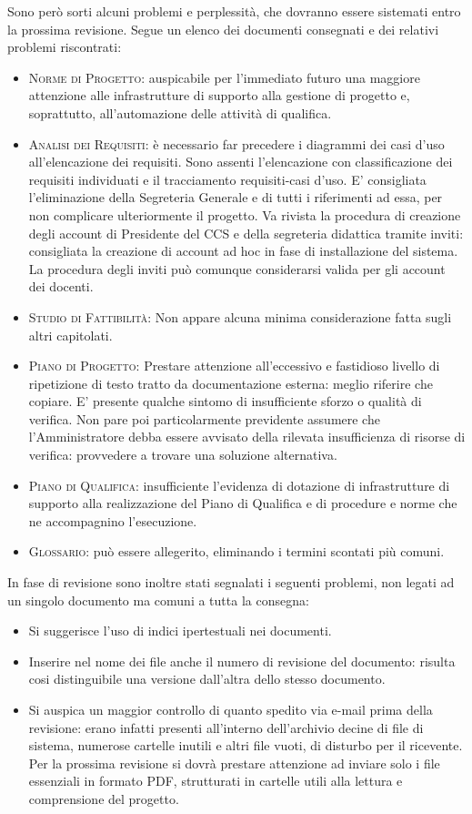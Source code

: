 \documentclass[11pt,a4paper]{article}
\begin{document}
Sono però sorti alcuni problemi e perplessità, che dovranno essere sistemati entro la prossima revisione.
Segue un elenco dei documenti consegnati e dei relativi problemi riscontrati:
\begin{itemize}
\item \textsc{Norme di Progetto:} auspicabile per l'immediato futuro una maggiore attenzione alle infrastrutture di supporto alla gestione di progetto e, soprattutto, all'automazione delle attività di qualifica.
\item \textsc{Analisi dei Requisiti:} è necessario far precedere i diagrammi dei casi d'uso all'elencazione dei requisiti.
Sono assenti l'elencazione con classificazione dei requisiti individuati e il tracciamento requisiti-casi d'uso.
E' consigliata l'eliminazione della Segreteria Generale e di tutti i riferimenti ad essa, per non complicare ulteriormente il progetto.
Va rivista la procedura di creazione degli account di Presidente del CCS e della segreteria didattica tramite inviti: consigliata la creazione di account ad hoc in fase di installazione del sistema. La procedura degli inviti può comunque considerarsi valida per gli account dei docenti.
\item \textsc{Studio di Fattibilità:} Non appare alcuna minima considerazione fatta sugli altri capitolati.
\item \textsc{Piano di Progetto:} Prestare attenzione all'eccessivo e fastidioso livello di ripetizione di testo tratto da documentazione esterna: meglio riferire che copiare.
E' presente qualche sintomo di insufficiente sforzo o qualità di verifica.
Non pare poi particolarmente previdente assumere che l'Amministratore debba essere avvisato della rilevata insufficienza di risorse di verifica: provvedere a trovare una soluzione alternativa.
\item \textsc{Piano di Qualifica:} insufficiente l'evidenza di dotazione di infrastrutture di supporto alla realizzazione del Piano di Qualifica e di procedure e norme che ne accompagnino l'esecuzione.
\item \textsc{Glossario:} può essere allegerito, eliminando i termini scontati più comuni.
\end{itemize}
In fase di revisione sono inoltre stati segnalati i seguenti problemi, non legati ad un singolo documento ma comuni a tutta la consegna:
\begin{itemize}
\item Si suggerisce l'uso di indici ipertestuali nei documenti.
\item Inserire nel nome dei file anche il numero di revisione del documento: risulta cosi distinguibile una versione dall'altra dello stesso documento.
\item Si auspica un maggior controllo di quanto spedito via e-mail prima della revisione: erano infatti presenti all'interno dell'archivio decine di file di sistema, numerose cartelle inutili e altri file vuoti, di disturbo per il ricevente. Per la prossima revisione si dovrà prestare attenzione ad inviare solo i file essenziali in formato PDF, strutturati in cartelle utili alla lettura e comprensione del progetto.
\end{itemize}
\end{document}
